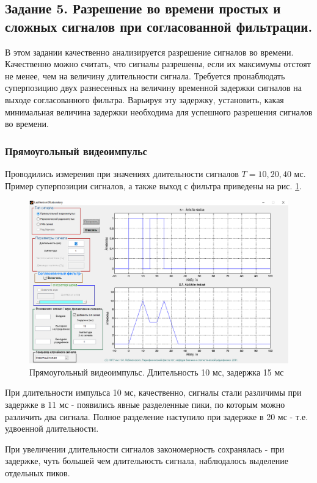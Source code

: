 \subsection{Задание 5. Разрешение во времени простых и сложных сигналов при
согласованной фильтрации.}

В этом задании качественно анализируется разрешение сигналов во
времени.
Качественно можно считать, что сигналы разрешены, если их максимумы
отстоят не менее, чем на величину длительности сигнала.
Требуется пронаблюдать суперпозицию двух разнесенных на величину
временной задержки сигналов на выходе согласованного фильтра. Варьируя эту
задержку, установить, какая минимальная величина задержки необходима для
успешного разрешения сигналов во времени.

\subsubsection{Прямоугольный видеоимпульс}
Проводились измерения при значениях длительности сигналов $T = 10, 20, 40$ мс. Пример суперпозиции сигналов, а также
выход с фильтра приведены на рис. \ref{fig:task5_1_10_15}.
\begin{figure}[H]
    \centering
    \includegraphics[width=0.9\linewidth]{imgs/task5/t5s1_dur10_del15.png}
    \caption{Прямоугольный видеоимпульс. Длительность 10 мс, задержка 15 мс}
    \label{fig:task5_1_10_15}
\end{figure}
При длительности импульса 10 мс, качественно, сигналы стали различимы при задержке в 11 мс - появились явные разделенные
пики, по которым можно различить два сигнала. Полное разделение наступило при задержке в 20 мс - т.е. удвоенной
длительности.

При увеличении длительности сигналов закономерность сохранялась - при задержке, чуть большей чем длительность сигнала,
наблюдалось выделение отдельных пиков.


